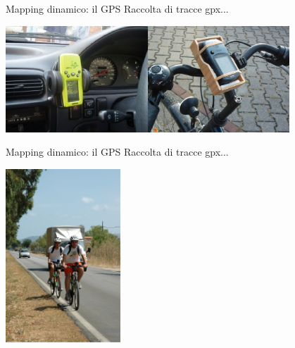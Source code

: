 \documentclass[slidestop,compress,red,notes,xcolor=dvipsnames]{beamer}	%
\begin{document}
        \begin{frame}{Mapping dinamico: il GPS}
            Raccolta di tracce gpx...
            \vspace{1cm}
            \begin{center}
                \includegraphics[height=4cm]{images/auto.eps}\includegraphics[height=4cm]{images/grezzata.eps}
            \end{center}
        \end{frame}

        \begin{frame}{Mapping dinamico: il GPS}
            Raccolta di tracce gpx...
            \begin{center}
                \includegraphics[height=6.5cm]{images/bici.eps}
            \end{center}
        \end{frame}
\end{document}
